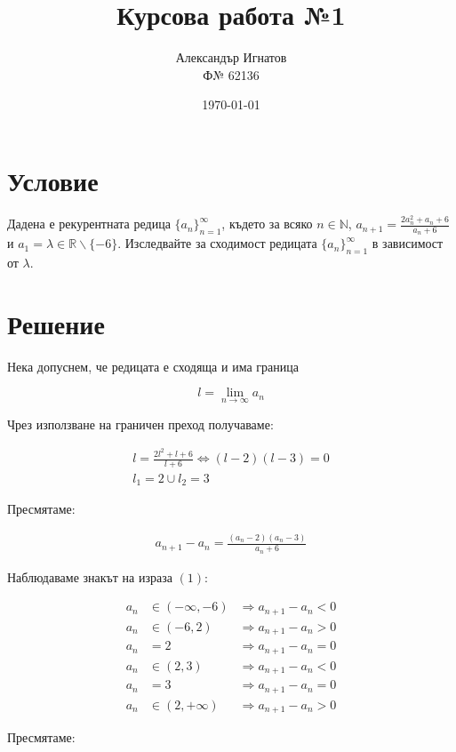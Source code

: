 \documentclass{article}
\title{Курсова работа №1}
\author{Александър Игнатов \\ Ф№ 62136 }
\date{\today}
\begin{document}
\maketitle

\section{Условие}

Дадена е рекурентната редица \( \{a_n\}_{n=1}^\infty \),
където за всяко \( n \in \mathbb{N} \),
\( a_{n+1}=\frac{2a_n^2 + a_n + 6}{a_n + 6} \) и \( a_1 = \lambda \in \mathbb{R} \backslash \{-6\} \).
Изследвайте за сходимост редицата \( \{a_n\}_{n=1}^\infty \) в зависимост от \(\lambda\).

\section{Решение}

Нека допуснем, че редицата е сходяща и има граница

\[
    l = \lim_{n \to \infty} a_n
\]

Чрез използване на граничен преход получаваме:

\begin{gather*}
    l = \frac{2l^2 + l + 6}{l + 6} \Longleftrightarrow (l-2)(l-3) = 0 \\
    l_1 = 2 \cup l_2 = 3
\end{gather*}

Пресмятаме:

\begin{gather}
    a_{n+1} - a_n = \frac{(a_n - 2)(a_n - 3)}{a_n + 6}
\end{gather}

Наблюдаваме знакът на израза \( (1) \):

\begin{align*}
    a_n &\in (-\infty, -6) &\Longrightarrow a_{n+1} - a_n < 0 \\
    a_n &\in (-6, 2) &\Longrightarrow a_{n+1} - a_n > 0 \\
    a_n &= 2 &\Longrightarrow a_{n+1} - a_n = 0 \\
    a_n &\in (2, 3) &\Longrightarrow a_{n+1} - a_n < 0 \\
    a_n &= 3 &\Longrightarrow a_{n+1} - a_n = 0 \\
    a_n &\in (2, +\infty) &\Longrightarrow a_{n+1} - a_n > 0
\end{align*}

Пресмятаме:
\end{document}

